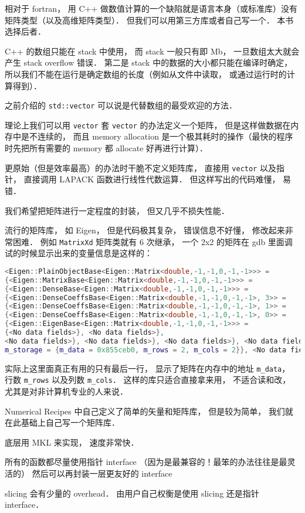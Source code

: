 
\begin{issues}
\issueDraft
\end{issues}

相对于 fortran， 用 C++ 做数值计算的一个缺陷就是语言本身（或标准库）没有矩阵类型（以及高维矩阵类型）． 但我们可以用第三方库或者自己写一个． 本书选择后者．

C++ 的数组只能在 stack 中使用， 而 stack 一般只有即 Mb， 一旦数组太大就会产生 stack overflow 错误． 第二是 stack 中的数据的大小都只能在编译时确定， 所以我们不能在运行是确定数组的长度（例如从文件中读取， 或通过运行时的计算得到）．

之前介绍的 \verb|std::vector| 可以说是代替数组的最受欢迎的方法．

理论上我们可以用 \verb|vector| 套 \verb|vector| 的办法定义一个矩阵， 但是这样做数据在内存中是不连续的， 而且 memory allocation 是一个极其耗时的操作（最快的程序时先把所有需要的 memory 都 allocate 好再进行计算）．

更原始（但是效率最高）的办法时干脆不定义矩阵库， 直接用 \verb|vector| 以及指针， 直接调用 LAPACK 函数进行线性代数运算． 但这样写出的代码难懂， 易错．

我们希望把矩阵进行一定程度的封装， 但又几乎不损失性能．

流行的矩阵库， 如 Eigen， 但是代码极其复杂， 错误信息不好懂， 修改起来非常困难． 例如 \verb|MatrixXd| 矩阵类就有 6 次继承， 一个 2x2 的矩阵在 gdb 里面调试的时候显示出来的变量信息是这样的：
\begin{lstlisting}[language=cpp]
<Eigen::PlainObjectBase<Eigen::Matrix<double,-1,-1,0,-1,-1>>> = 
{<Eigen::MatrixBase<Eigen::Matrix<double,-1,-1,0,-1,-1>>> = 
{<Eigen::DenseBase<Eigen::Matrix<double,-1,-1,0,-1,-1>>> = 
{<Eigen::DenseCoeffsBase<Eigen::Matrix<double,-1,-1,0,-1,-1>, 3>> = 
{<Eigen::DenseCoeffsBase<Eigen::Matrix<double,-1,-1,0,-1,-1>, 1>> = 
{<Eigen::DenseCoeffsBase<Eigen::Matrix<double,-1,-1,0,-1,-1>, 0>> = 
{<Eigen::EigenBase<Eigen::Matrix<double,-1,-1,0,-1,-1>>> =
{<No data fields>}, <No data fields>}, 
<No data fields>}, <No data fields>}, <No data fields>}, <No data fields>},
m_storage = {m_data = 0x855ceb0, m_rows = 2, m_cols = 2}}, <No data fields>
\end{lstlisting}
实际上这里面真正有用的只有最后一行， 显示了矩阵在内存中的地址 \verb|m_data|， 行数 \verb|m_rows| 以及列数 \verb|m_cols|． 这样的库只适合直接拿来用， 不适合读和改， 尤其是对非计算机专业的人来说．

Numerical Recipes 中自己定义了简单的矢量和矩阵库， 但是较为简单， 我们就在此基础上自己写一个矩阵库．

底层用 MKL 来实现， 速度非常快．

所有的函数都尽量使用指针 interface （因为是最兼容的！最笨的办法往往是最灵活的） 然后可以再封装一层更友好的 interface

slicing 会有少量的 overhead． 由用户自己权衡是使用 slicing 还是指针 interface．
